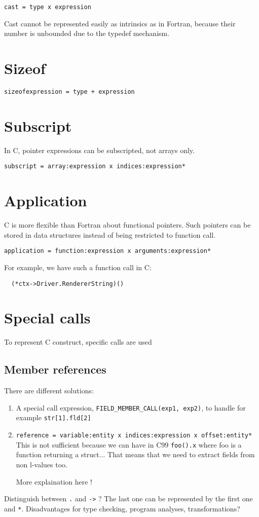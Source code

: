 \documentclass[a4paper]{report}
\begin{document}
\verb/cast = type x expression/

Cast cannot be represented easily as intrinsics as in Fortran, because
their number is unbounded due to the typedef mechanism.

\section{Sizeof}
\verb/sizeofexpression = type + expression/

\section{Subscript}

In C, pointer expressions can be subscripted, not arrays only.

\verb/subscript = array:expression x indices:expression*/

\section{Application}

C is more flexible than Fortran about functional pointers. Such pointers
can be stored in data structures instead of being restricted to function
call.

\verb/application = function:expression x arguments:expression*/

For example, we have such a function call in C:
\begin{lstlisting}
  (*ctx->Driver.RendererString)()
\end{lstlisting}


\section{Special calls}

To represent C construct, specific calls are used

\subsection{Member references }

There are different solutions:
\begin{enumerate}
\item A special call expression, \lstinline/FIELD_MEMBER_CALL(exp1, exp2)/, to handle for example
\lstinline|str[1].fld[2]|
\item
  \verb/reference = variable:entity x indices:expression x offset:entity*/
  This is not sufficient because we can have in C99 \lstinline|foo().x|
  where foo is a function returning a struct... That means that we need to
  extract fields from non l-values too.

More explaination here !
\end{enumerate}
 Distinguish between \texttt{.} and \verb/->/ ? The last one can be represented by
 the first one and \texttt{*}. 
 Disadvantages for type checking, program
analyses, transformations?
\end{document}
